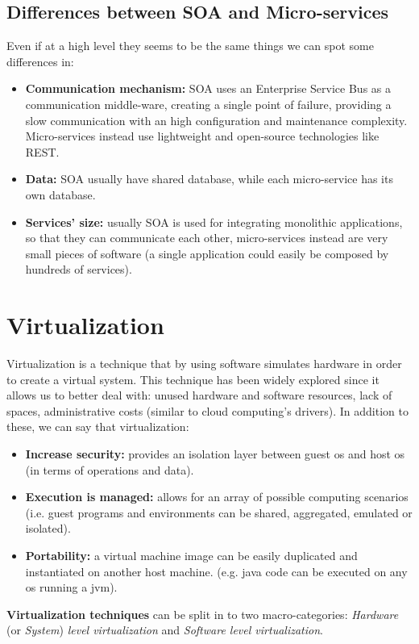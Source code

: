 \documentclass{article}
\begin{document}
\subsection{Differences between SOA and Micro-services}
Even if at a high level they seems to be the same things we can spot some differences in:
\begin{itemize}
    \item \textbf{Communication mechanism:} SOA uses an Enterprise Service Bus as a communication middle-ware, creating a single point of failure, providing a slow communication with an high configuration and maintenance complexity. Micro-services instead use lightweight and open-source technologies like REST.
    \item \textbf{Data:} SOA usually have shared database, while each micro-service has its own database.
    \item \textbf{Services' size:} usually SOA is used for integrating monolithic applications, so that they can communicate each other, micro-services instead are very small pieces of software (a single application could easily be composed by hundreds of services).
\end{itemize}

\section{Virtualization}
Virtualization is a technique that by using software simulates hardware in order to create a virtual system. This technique has been widely explored since it allows us to better deal with: unused hardware and software resources, lack of spaces, administrative costs (similar to cloud computing's drivers).
In addition to these, we can say that virtualization:
\begin{itemize}
    \item \textbf{Increase security:} provides an isolation layer between guest os and host os (in terms of operations and data).
    \item \textbf{Execution is managed:} allows for an array of possible computing scenarios (i.e. guest programs and environments can be shared, aggregated, emulated or isolated).
    \item \textbf{Portability:} a virtual machine image can be easily duplicated and instantiated on another host machine. (e.g. java code can be executed on any os running a jvm).
\end{itemize}

\textbf{Virtualization techniques} can be split in to two macro-categories: \textit{Hardware} (or \textit{System}) \textit{level virtualization} and \textit{Software level virtualization}.
\end{document}
